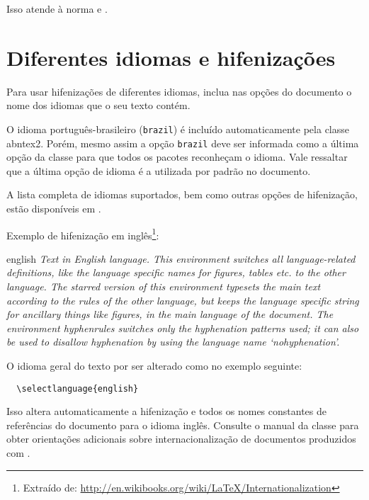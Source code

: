 Isso atende à norma  e .

\section{Diferentes idiomas e hifenizações}
\label{sec-hifenizacao}

Para usar hifenizações de diferentes idiomas, inclua nas opções do documento o nome dos idiomas que o seu texto contém.

O idioma português-brasileiro (\texttt{brazil}) é incluído automaticamente pela classe \textsf{abntex2}. Porém, mesmo assim a opção \texttt{brazil} deve ser informada como a última opção da classe para que todos os pacotes reconheçam o idioma. Vale ressaltar que a última opção de idioma é a utilizada por padrão no documento.

A lista completa de idiomas suportados, bem como outras opções de hifenização, estão disponíveis em .

Exemplo de hifenização em inglês\footnote{Extraído de: \url{http://en.wikibooks.org/wiki/LaTeX/Internationalization}}:

\begin{otherlanguage*}{english}
\textit{Text in English language. This environment switches all language-related definitions, like the language specific names for figures, tables etc. to the other language. The starred version of this environment typesets the main text according to the rules of the other language, but keeps the language specific string for ancillary things like figures, in the main language of the document. The environment hyphenrules switches only the hyphenation patterns used; it can also be used to disallow hyphenation by using the language name `nohyphenation'.}
\end{otherlanguage*}

O idioma geral do texto por ser alterado como no exemplo seguinte:

\begin{verbatim}
  \selectlanguage{english}
\end{verbatim}

Isso altera automaticamente a hifenização e todos os nomes constantes de referências do documento para o idioma inglês. Consulte o manual da classe \cite{abntex2classe} para obter orientações adicionais sobre internacionalização de documentos produzidos com \abnTeX.

